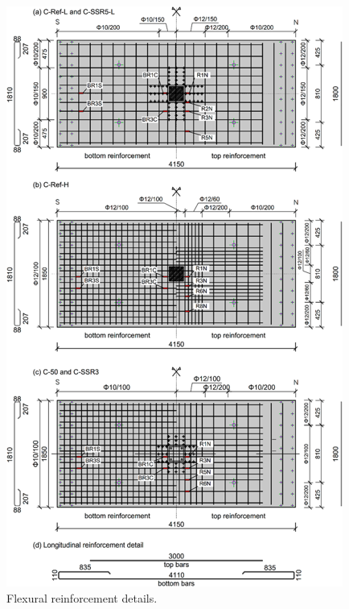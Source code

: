 \begin{figure}\centering
    \includegraphics[width=\columnwidth]{Figures/i2021f1.png}
    \caption{Flexural reinforcement details\citep{isufi2021}.}
    \label{i2021f1}
    \end{figure}